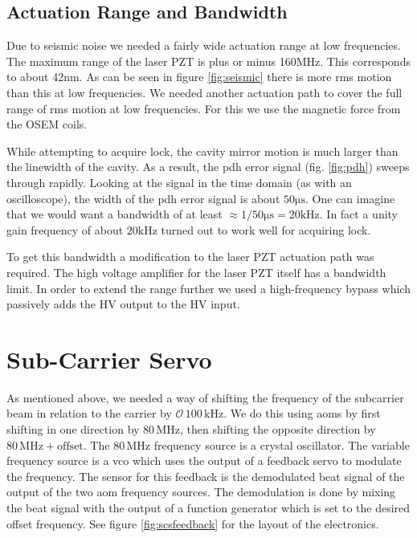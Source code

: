 
\subsection{Actuation Range and Bandwidth}
Due to seismic noise we needed a fairly wide actuation range at low frequencies.
The maximum range of the laser PZT is plus or minus 160MHz.
This corresponds to about 42nm.
As can be seen in figure \ref{fig:seismic} there is more rms motion than this
at low frequencies.
We needed another actuation path to cover the full range of rms motion at low
frequencies.
For this we use the magnetic force from the OSEM coils.

While attempting to acquire lock, the cavity mirror motion is much larger than
the linewidth of the cavity.
As a result, the \ac{pdh} error signal (fig. \ref{fig:pdh}) sweeps through
rapidly.
Looking at the signal in the time domain (as with an oscilloscope), the
width of the \ac{pdh} error signal is about $50\mathrm{\mu s}$.
One can imagine that we would want a bandwidth of at least
$\approx 1/50\mathrm{\mu s} = 20\mathrm{kHz}$.
In fact a unity gain frequency of about $20\mathrm{kHz}$ turned out to work
well for acquiring lock.

To get this bandwidth a modification to the laser PZT actuation path was
required.
The high voltage amplifier for the laser PZT itself has a bandwidth limit.
In order to extend the range further we used a high-frequency
bypass which passively adds the HV output to the HV input.


\section{Sub-Carrier Servo}
\label{sec:scservo}
As mentioned above, we needed a way of shifting the frequency of the subcarrier
beam in relation to the carrier by $\mathcal{O}\, 100\,\mathrm{kHz}$.
We do this using \ac{aom}s by first shifting in one direction by
$80\,\mathrm{MHz}$, then shifting the opposite direction by
$80\,\mathrm{MHz} + \mathrm{offset}$.
The $80\,\mathrm{MHz}$ frequency source is a crystal oscillator.
The variable frequency source is a \ac{vco} which uses the output of a feedback
servo to modulate the frequency.
The sensor for this feedback is the demodulated beat signal of the output of
the two \ac{aom} frequency sources.
The demodulation is done by mixing the beat signal with the output of a
function generator which is set to the desired offset frequency.
See figure \ref{fig:scsfeedback} for the layout of the electronics.

